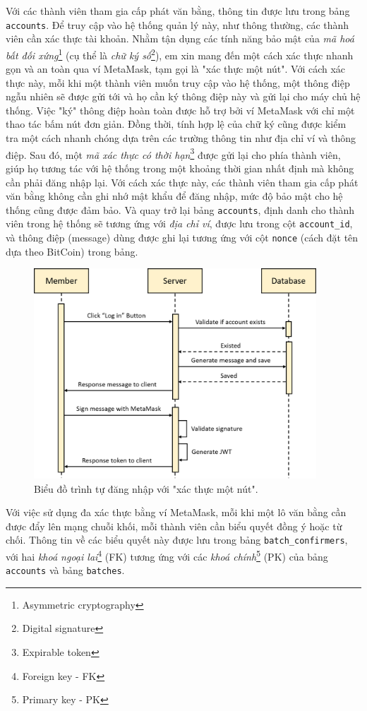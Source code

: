 Với các thành viên tham gia cấp phát văn bằng, thông tin được lưu trong bảng \texttt{accounts}. Để truy cập vào hệ thống quản lý này, như thông thường, các thành viên cần xác thực tài khoản. Nhằm tận dụng các tính năng bảo mật của \textit{mã hoá bất đối xứng}\footnote{Asymmetric cryptography} (cụ thể là \textit{chữ ký số}\footnote{Digital signature}), em xin mang đến một cách xác thực nhanh gọn và an toàn qua ví MetaMask, tạm gọi là "xác thực một nút". Với cách xác thực này, mỗi khi một thành viên muốn truy cập vào hệ thống, một thông điệp ngẫu nhiên sẽ được gửi tới và họ cần ký thông điệp này và gửi lại cho máy chủ hệ thống. Việc "ký" thông điệp hoàn toàn được hỗ trợ bởi ví MetaMask với chỉ một thao tác bấm nút đơn giản. Đồng thời, tính hợp lệ của chữ ký cũng được kiểm tra một cách nhanh chóng dựa trên các trường thông tin như địa chỉ ví và thông điệp. Sau đó, một \textit{mã xác thực có thời hạn}\footnote{Expirable token} được gửi lại cho phía thành viên, giúp họ tương tác với hệ thống trong một khoảng thời gian nhất định mà không cần phải đăng nhập lại. Với cách xác thực này, các thành viên tham gia cấp phát văn bằng không cần ghi nhớ mật khẩu để đăng nhập, mức độ bảo mật cho hệ thống cũng được đảm bảo. Và quay trở lại bảng \texttt{accounts}, định danh cho thành viên trong hệ thống sẽ tương ứng với \textit{địa chỉ ví}, được lưu trong cột \texttt{account\_id}, và thông điệp (message) dùng được ghi lại tương ứng với cột \texttt{nonce} (cách đặt tên dựa theo BitCoin) trong bảng.\\

\clearpage
\begin{figure}[ht]
    \centering
    \includegraphics[width=400px]{anh/giai-phap/login-flow.png}
    \caption{Biểu đồ trình tự đăng nhập với "xác thực một nút".}
\end{figure}

Với việc sử dụng đa xác thực bằng ví MetaMask, mỗi khi một lô văn bằng cần được đẩy lên mạng chuỗi khối, mỗi thành viên cần biểu quyết đồng ý hoặc từ chối. Thông tin về các biểu quyết này được lưu trong bảng \texttt{batch\_confirmers}, với hai \textit{khoá ngoại lai}\footnote{Foreign key - FK} (FK) tương ứng với các \textit{khoá chính}\footnote{Primary key - PK} (PK) của bảng \texttt{accounts} và bảng \texttt{batches}.\\

